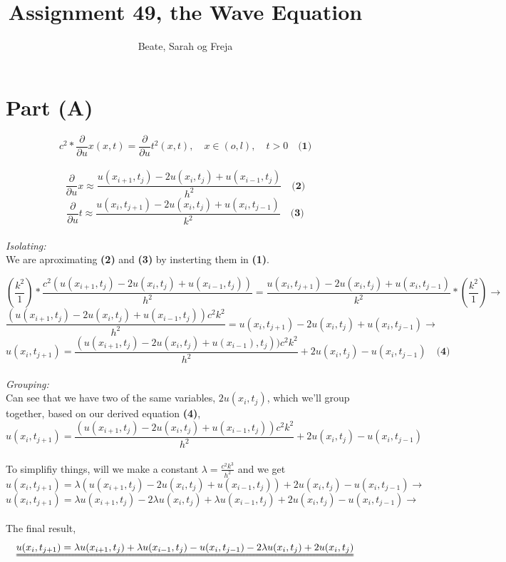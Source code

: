 \documentclass[a4paper]{article}
\title{Assignment 49, the Wave Equation}
\author{Beate, Sarah og Freja}
\newcommand{\pder}[2][]{\frac{\partial#1}{\partial#2}}
\begin{document}
\maketitle

\section*{Part (A)}
$$
c^2* \pder{u}{x}(x,t)= \pder{u}{t^2}(x,t), \quad x \in (o,l), \quad t>0 \quad\textbf{(1)}
$$
\\
$$
\pder{u}{x} \approx \frac{u(x_{i+1},t_j)-2u(x_i,t_j)+u(x_{i-1},t_j)}{h^2} \quad \textbf{(2)}
$$
$$
\pder{u}{t} \approx \frac{u(x_i,t_{j+1})-2u(x_i,t_j)+u(x_i,t_{j-1})}{k^2} \quad \textbf{(3)}
$$
\\
\textit{Isolating:} \\
We are aproximating \textbf{(2)} and \textbf{(3)} by insterting them in \textbf{(1)}.

$$
(\frac{k^2}{1})*\frac{c^2(u(x_{i+1},t_j)-2u(x_i,t_j)+u(x_{i-1},t_j))}{h^2}=\frac{u(x_i,t_{j+1})-2u(x_i,t_j)+u(x_i,t_{j-1})}{k^2}*(\frac{k^2}{1}) \rightarrow
$$
$$
\frac{(u(x_{i+1},t_j)-2u(x_i,t_j)+u(x_{i-1},t_j))c^2k^2}{h^2}=u(x_i,t_{j+1})-2u(x_i,t_j)+u(x_i,t_{j-1}) \rightarrow 
$$
$$
u(x_i,t_{j+1})=\frac{(u(x_{i+1},t_j)-2u(x_i,t_j)+u(x_{i-1}),t_j))c^2k^2}{h^2}+2u(x_i,t_j)-u(x_i,t_{j-1}) \quad \textbf{(4)}
$$
\\
\textit{Grouping:} \\
Can see that we have two of the same variables, $2u(x_i,t_j)$, which we'll group together, based on our derived equation  \textbf{(4)},
$$u(x_i,t_{j+1})=\frac{(u(x_{i+1},t_j)-2u(x_i,t_j)+u(x_{i-1},t_j))c^2k^2}{h^2}+2u(x_i,t_j)-u(x_i,t_{j-1})$$
\\
To simplifiy things, will we make a constant $\lambda=\frac{c^2k^3}{h^2}$ and we get
$$
u(x_i,t_{j+1})=\lambda(u(x_{i+1},t_j)-2u(x_i,t_j)+u(x_{i-1},t_j))+2u(x_i,t_j)-u(x_i,t_{j-1}) \rightarrow
$$
$$
u(x_i,t_{j+1})=\lambda u(x_{i+1},t_j)-2\lambda u(x_i,t_j)+ \lambda u(x_{i-1},t_j)+2u(x_i,t_j)-u(x_i,t_{j-1}) \rightarrow
$$
\\
The final result,
$$
\uuline{u(x_i,t_{j+1})=\lambda u(x_{i+1},t_j)+\lambda   u(x_{i-1},t_j)-u(x_i,t_{j-1})-2\lambda u(x_i,t_j)+2u(x_i,t_j)}
$$
\\
\end{document}
